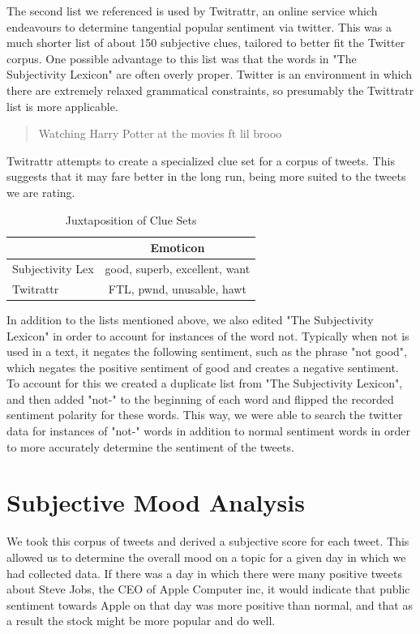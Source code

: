 \documentclass[11pt]{article}
\begin{document}
The second list we referenced is used by Twitrattr, an online service which endeavours to determine tangential popular sentiment via twitter. This was a much shorter list of about 150 subjective clues, tailored to better fit the Twitter corpus. One possible advantage to this list was that the words in "The Subjectivity Lexicon" are often overly proper. Twitter is an environment in which there are extremely relaxed grammatical constraints, so presumably the Twittratr list is more applicable.

\begin{quote}
Watching Harry Potter at the movies ft lil brooo
\end{quote}
Twitrattr attempts to create a specialized clue set for a corpus of tweets. This suggests that it may fare better in the long run, being more suited to the tweets we are rating.

\begin{table}[ht!]
\centering
\caption{Juxtaposition of Clue Sets}
\begin{tabular}{|l|c|}
\hline
 & Emoticon \\
\hline
Subjectivity Lex& good, superb, excellent, want\\
\hline
Twitrattr & FTL, pwnd, unusable, hawt\\
\hline
\end{tabular}
\end{table}

In addition to the lists mentioned above, we also edited "The Subjectivity Lexicon" in order to account for instances of the word not.  Typically when not is used in a text, it negates the following sentiment, such as the phrase "not good", which negates the positive sentiment of good and creates a negative sentiment. To account for this we created a duplicate list from "The Subjectivity Lexicon", and then added "not-" to the beginning of each word and flipped the recorded sentiment polarity for these words.  This way, we were able to search the twitter data for instances of "not-" words in addition to normal sentiment words in order to more accurately determine the sentiment of the tweets.

\section{Subjective Mood Analysis}
We took this corpus of tweets and derived a subjective score for each tweet. This allowed us to determine the overall mood on a topic for a given day in which we had collected data. If there was a day in which there were many positive tweets about Steve Jobs, the CEO of Apple Computer inc, it would indicate that public sentiment towards Apple on that day was more positive than normal, and that as a result the stock might be more popular and do well.
\end{document}
